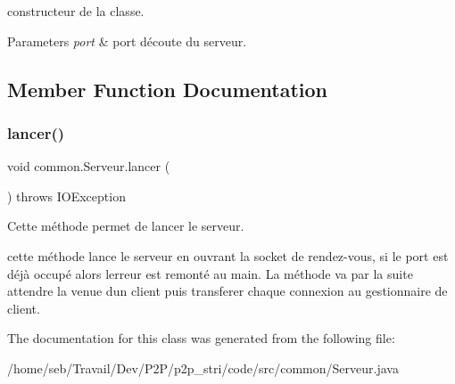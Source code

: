 constructeur de la classe. 


\begin{DoxyParams}{Parameters}
{\em port} & port d\textquotesingle{}écoute du serveur. \\
\hline
\end{DoxyParams}


\subsection{Member Function Documentation}
\mbox{\label{classcommon_1_1Serveur_a9924019a4577e360dafa9ab6df2d4ffd}} 
\subsubsection{\texorpdfstring{lancer()}{lancer()}}
{\footnotesize\ttfamily void common.\+Serveur.\+lancer (\begin{DoxyParamCaption}{ }\end{DoxyParamCaption}) throws I\+O\+Exception\hspace{0.3cm}{\ttfamily [inline]}}



Cette méthode permet de lancer le serveur. 

cette méthode lance le serveur en ouvrant la socket de rendez-\/vous, si le port est déjà occupé alors l\textquotesingle{}erreur est remonté au main. La méthode va par la suite attendre la venue d\textquotesingle{}un client puis transferer chaque connexion au gestionnaire de client. 

The documentation for this class was generated from the following file\+:\begin{DoxyCompactItemize}
\item 
/home/seb/\+Travail/\+Dev/\+P2\+P/p2p\+\_\+stri/code/src/common/Serveur.\+java\end{DoxyCompactItemize}
